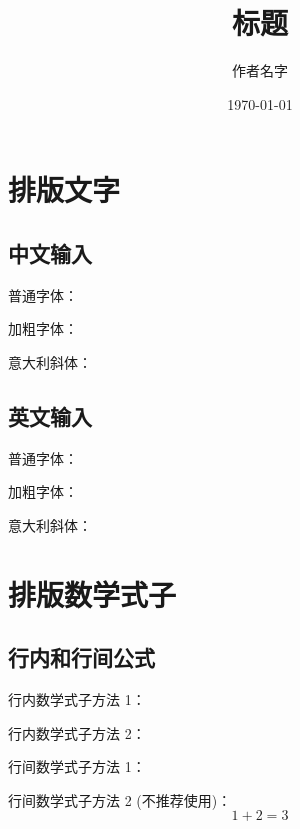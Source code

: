 \documentclass{ctexart}
\title{标题}
\author{作者名字}
\date{\today}
\begin{document}
\maketitle

\section{排版文字}\label{sec:text}

\subsection{中文输入}\label{sub:basic-text-chinese}

普通字体：

加粗字体：

意大利斜体：

\subsection{英文输入}\label{sub:basic-text-english}

普通字体：

加粗字体：

意大利斜体：

\section{排版数学式子}\label{sec:math}

\subsection{行内和行间公式}\label{sub:math-eq}

行内数学式子方法 1：

行内数学式子方法 2：

行间数学式子方法 1：

行间数学式子方法 2 (不推荐使用)：$$ 1 + 2 = 3 $$
\end{document}
